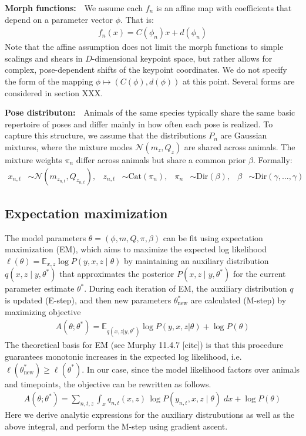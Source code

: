 \documentclass{article}         %
\newcommand{\EE}{\mathbb{E}}
\begin{document}
\textbf{Morph functions:}\ \ We assume each $f_n$ is an affine map with coefficients that depend on a parameter vector $\phi$. That is:
\begin{align}
    f_n(x) = C(\phi_n) x + d(\phi_n) 
\end{align}
Note that the affine assumption does not limit the morph functions to simple scalings and shears in $D$-dimensional keypoint space, but rather allows for complex, pose-dependent shifts of the keypoint coordinates. We do not specify the form of the mapping $\phi \mapsto (C(\phi), d(\phi))$ at this point. Several forms are considered in section XXX.

\textbf{Pose distributon:}\ \ Animals of the same species typically share the same basic repertoire of poses and differ mainly in how often each pose is realized. To capture this structure, we assume that the distributions $P_n$ are Gaussian mixtures, where the mixture modes $\mathcal{N}(m_z, Q_z)$ are shared across animals. The mixture weights $\pi_n$ differ across animals but share a common prior $\beta$. Formally:
\begin{align*}
    x_{n,t} & \sim \mathcal{N}(m_{z_{n,t}}, Q_{z_{n,t}}), &
    z_{n,t} & \sim \text{Cat}(\pi_n), &
    \pi_n & \sim \text{Dir}(\beta), &
    \beta & \sim \text{Dir}(\gamma,\dots,\gamma)
\end{align*}

\subsection{Expectation maximization}
\label{sec:em-general}

The model parameters $\theta = (\phi, m, Q, \pi, \beta)$ can be fit using expectation maximization (EM), which aims to maximize the expected log likelihood $\ell(\theta) = \EE_{x,z} \log P(y, x, z \mid \theta)$ by maintaining an auxiliary distribution $q(x, z \mid y, \theta^*)$ that approximates the posterior $P(x, z \mid y, \theta^*)$ for the current parameter estimate $\theta^*$. During each iteration of EM, the auxiliary distribution $q$ is updated (E-step), and then new parameters $\theta^*_{\text{new}}$ are calculated (M-step) by maximizing objective
\begin{align}
    A(\theta; \theta^*) = \EE_{q(x, z | y, \theta^*)} \log P(y, x, z | \theta) + \log P(\theta)\label{eq:em-argmax}
\end{align}
The theoretical basis for EM (see Murphy 11.4.7 [cite]) is that this procedure guarantees monotonic increases in the expected log likelihood, i.e. $\ell(\theta^*_{\text{new}}) \geq \ell(\theta^*)$. In our case, since the model likelihood factors over animals and timepoints, the objective can be rewritten as follows.
\begin{align}
    A(\theta; \theta^*) = \sum_{n,t,z}  \int_x q_{n,t}(x, z)\, \log P(y_{n,t}, x, z \mid \theta) \; dx + \log P(\theta)\label{eq:em-int-argmax}
\end{align}
Here we derive analytic expressions for the auxiliary distrubutions as well as the above integral, and perform the M-step using gradient ascent.
\end{document}
